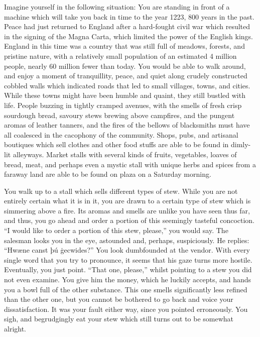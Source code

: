 Imagine yourself in the following situation: You are standing in front of a machine which will take you back in time to the year 1223, 800 years in the past. Peace had just returned to England after a hard-fought civil war which resulted in the signing of the Magna Carta, which limited the power of the English kings. England in this time was a country that was still full of meadows, forests, and pristine nature, with a relatively small population of an estimated 4 million people, nearly 60 million fewer than today. You would be able to walk around, and enjoy a moment of tranquillity, peace, and quiet along crudely constructed cobbled walls which indicated roads that led to small villages, towns, and cities. While these towns might have been humble and quaint, they still bustled with life. People buzzing in tightly cramped avenues, with the smells of fresh crisp sourdough bread, savoury stews brewing above campfires, and the pungent aromas of leather tanners, and the fires of the bellows of blacksmiths must have all coalesced in the cacophony of the community. Shops, pubs, and artisanal boutiques which sell clothes and other food stuffs are able to be found in dimly-lit alleyways. Market stalls with several kinds of fruits, vegetables, loaves of bread, meat, and perhaps even a mystic stall with unique herbs and spices from a faraway land are able to be found on plaza on a Saturday morning. 

You walk up to a stall which sells different types of stew. While you are not entirely certain what it is in it, you are drawn to a certain type of stew which is simmering above a fire. Its aromas and smells are unlike you have seen thus far, and thus, you go ahead and order a portion of this seemingly tasteful concoction. “I would like to order a portion of this stew, please,” you would say. The salesman looks you in the eye, astounded and, perhaps, suspiciously. He replies: “Hwæne canst þú ġecwides?” You look dumbfounded at the vendor. With every single word that you try to pronounce, it seems that his gaze turns more hostile. Eventually, you just point. “That one, please,” whilst pointing to a stew you did not even examine. You give him the money, which he luckily accepts, and hands you a bowl full of the other substance. This one smells significantly less refined than the other one, but you cannot be bothered to go back and voice your dissatisfaction. It was your fault either way, since you pointed erroneously. You sigh, and begrudgingly eat your stew which still turns out to be somewhat alright. 

